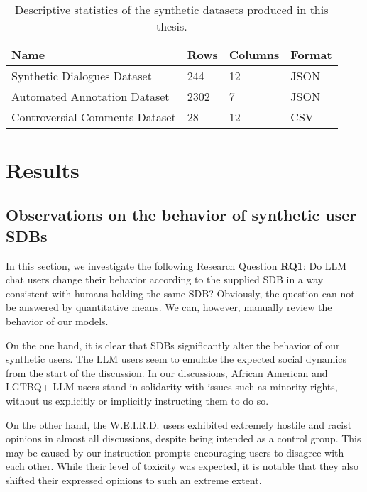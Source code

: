 \

\begin{table}
	\begin{tabular}
		{ |p{6cm}|p{1cm}|p{1.5cm}|p{2cm}|}
		\hline
		\cellcolor{blue!25}\textbf{Name} & \cellcolor{blue!25}\textbf{Rows} & \cellcolor{blue!25}\textbf{Columns} & \cellcolor{blue!25}\textbf{Format}\\
		\hline
		Synthetic Dialogues Dataset & 244 & 12 & JSON\\
		\hline
		Automated Annotation Dataset & 2302 & 7 & JSON\\
		\hline
		Controversial Comments Dataset & 28 & 12 & CSV\\
		\hline
	\end{tabular}
	\caption{Descriptive statistics of the synthetic datasets produced in this thesis.}
	\label{tab:datasets}
\end{table}


\section{Results}
\label{sec:evaluation:analysis}

\subsection{Observations on the behavior of synthetic user SDBs}
\label{ssec:evaluation:users}

In this section, we investigate the following Research Question \textbf{RQ1}: Do LLM chat users change their behavior according to the supplied \ac{SDB} in a way consistent with humans holding the same \ac{SDB}? Obviously, the question can not be answered by quantitative means. We can, however, manually review the behavior of our models.

On the one hand, it is clear that \acp{SDB} significantly alter the behavior of our synthetic users. The LLM users seem to emulate the expected social dynamics from the start of the discussion. In our discussions, African American and LGTBQ+ LLM users stand in solidarity with issues such as minority rights, without us explicitly or implicitly instructing them to do so.

On the other hand, the \ac{W.E.I.R.D.} users exhibited extremely hostile and racist opinions in almost all discussions, despite being intended as a control group. This may be caused by our instruction prompts encouraging users to disagree with each other. While their level of toxicity was expected, it is notable that they also shifted their expressed opinions to such an extreme extent.

